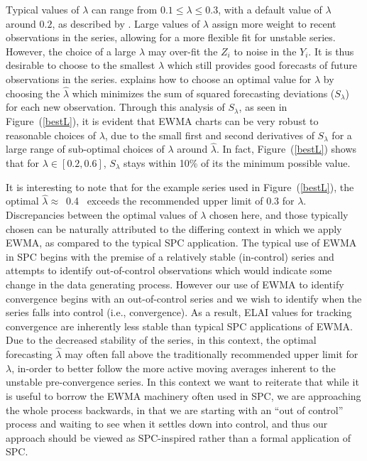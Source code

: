 \documentclass[12pt]{article}
\def \rastLamb {
        0.4
}
\begin{document}
\vspace{-0.8cm}
%
%
Typical values of $\lambda$ can range from \mbox{$0.1\le\lambda\le0.3$}, with a default value of $\lambda$ around $0.2$, as described by \cite{boxBook}.
%
Large values of $\lambda$ assign more weight to recent observations in the series, allowing for a more flexible fit for unstable series.
%
However, the choice of a large $\lambda$ may over-fit the $Z_i$ to noise in the $Y_i$.
%
It is thus desirable to choose to the smallest $\lambda$ which still provides good forecasts of future
observations in the series.
\cite{boxBook} explains how to choose an optimal value for $\lambda$ by choosing the $\hat\lambda$ which minimizes the sum of squared forecasting deviations ($S_\lambda$) for each new observation.
Through this analysis of $S_\lambda$, as seen in Figure~(\ref{bestL}), it is evident that EWMA charts can be very robust to reasonable choices of $\lambda$, due to the small first and second derivatives of $S_\lambda$ for a large range of sub-optimal choices of $\lambda$ around $\hat\lambda$. %
%
In fact, Figure~(\ref{bestL}) shows that for \mbox{$\lambda\in[0.2, 0.6]$,} $S_\lambda$ stays within 10\% of its the minimum possible value.

%
%

%
It is interesting to note that for the example series used in Figure~(\ref{bestL}), the optimal \mbox{$\hat \lambda\approx$\rastLamb} exceeds the recommended upper limit of 0.3 for $\lambda$. 
%
Discrepancies between the optimal values of $\lambda$ chosen here, and those typically chosen can be naturally attributed to the differing context in which we apply EWMA, as compared to the typical SPC application. 
The typical use of EWMA in SPC begins with the premise of a relatively stable (in-control) series and attempts to identify out-of-control observations which would indicate some change in the data generating process.
%
However our use of EWMA to identify convergence begins with an out-of-control series and we wish to identify when the series falls into control (i.e., convergence).
%
As a result, ELAI values for tracking convergence are inherently less stable than typical SPC applications of EWMA.
Due to the decreased stability of the series, in this context, the optimal forecasting $\hat\lambda$ may often fall above the traditionally recommended upper limit for $\lambda$, in-order to better follow the more active moving averages inherent to the unstable pre-convergence series. 
%
In this context we want to reiterate that while it is useful to borrow the EWMA machinery often used in SPC, we are approaching the whole process backwards, in that we are starting with an ``out of control'' process and waiting to see when it settles down into control, and thus our approach should be viewed as SPC-inspired rather than a formal application of SPC.
\end{document}
